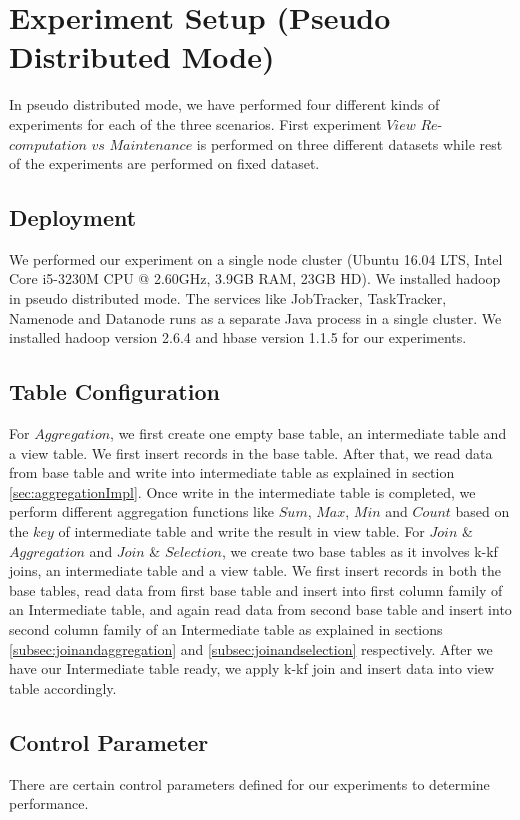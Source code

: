 \documentclass[11pt,a4paper,bibtotoc,idxtotoc,headsepline,footsepline,footexclude,BCOR12mm,DIV13]{scrbook}
\begin{document}
\section{Experiment Setup (Pseudo Distributed Mode)}
In pseudo distributed mode, we have performed four different kinds of experiments for each of the three scenarios. First experiment $View$ $Re$-$computation$ $vs$ $Maintenance$ is performed on three different datasets while rest of the experiments are performed on fixed dataset.

\subsection{Deployment}
We performed our experiment on a single node cluster (Ubuntu 16.04 LTS, Intel Core i5-3230M CPU @ 2.60GHz, 3.9GB RAM, 23GB HD). We installed hadoop in pseudo distributed mode. The services like JobTracker, TaskTracker, Namenode and Datanode runs as a separate Java process in a single cluster. We installed hadoop version 2.6.4 and hbase version 1.1.5 for our experiments.

\subsection{Table Configuration}
\label{Table Configuration standalone}
For $Aggregation$, we first create one empty base table, an intermediate table and a view table. We first insert records in the base table. After that, we read data from base table and write into intermediate table as explained in section \ref{sec:aggregationImpl}. Once write in the intermediate table is completed, we perform different aggregation functions like $Sum$, $Max$, $Min$ and $Count$ based on the $key$ of intermediate table and write the result in view table.
\linebreak
\linebreak
For $Join$ \& $Aggregation$ and $Join$ \& $Selection$, we create two base tables as it involves k-kf joins, an intermediate table and a view table. We first insert records in both the base tables, read data from first base table and insert into first column family of an Intermediate table, and again read data from second base table and insert into second column family of an Intermediate table as explained in sections \ref{subsec:joinandaggregation} and \ref{subsec:joinandselection} respectively. After we have our Intermediate table ready, we apply k-kf join and insert data into view table accordingly.

\subsection{Control Parameter}
\label{Control Parameter}
There are certain control parameters defined for our experiments to determine performance.
\end{document}
